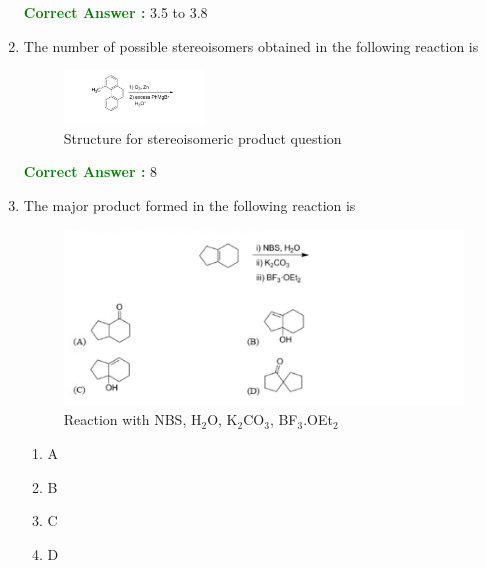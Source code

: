 \documentclass[journal,12pt,onecolumn]{exam}
\theoremstyle{remark}
\newcommand{\correct}{\textcolor{correctgreen}{\checkmark}}
\newcommand{\wrong}{\textcolor{wrongred}{\ding{55}}} %
\begin{document}
\begin{enumerate}
\hfill{}

\textcolor{green}{\textbf{Correct Answer :}} 3.5 to 3.8







\item 
The number of possible stereoisomers obtained in the following reaction is 
\begin{figure}[H]
\centering
\includegraphics[width=0.35\textwidth]{figs/image12.png}
\caption{Structure for stereoisomeric product question}
\label{fig:q56}
\end{figure}

\hfill{}

\textcolor{green}{\textbf{Correct Answer :}} 8


\item 
The major product formed in the following reaction is 
\begin{figure}[H]
\centering
\includegraphics[width=\textwidth]{figs/image13.png}
\caption{Reaction with NBS, H$_2$O, K$_2$CO$_3$, BF$_3$.OEt$_2$}
\label{fig:q57}
\end{figure}



\hfill{}

\begin{multicols}{2}
\begin{enumerate}[leftmargin=*, align=left]
    \item \wrong A
    \item \wrong B
    \item \wrong C
    \item \correct D
\end{enumerate}
\end{multicols}



\end{enumerate}
\end{document}
